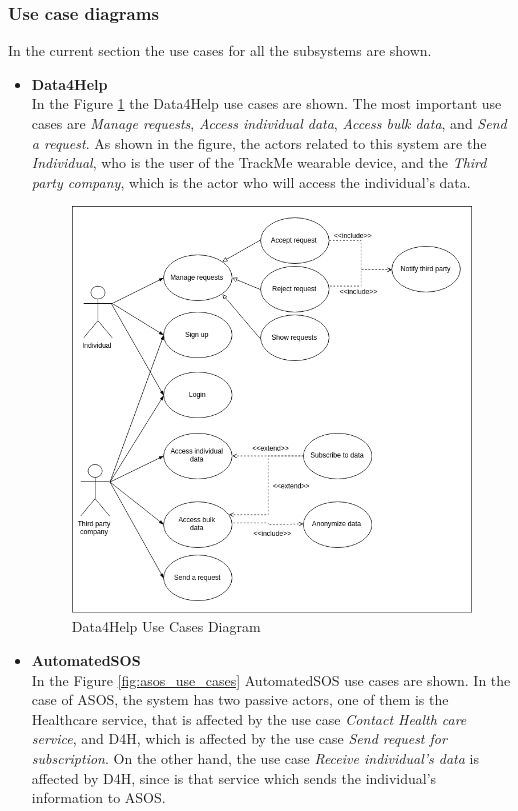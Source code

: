 \documentclass[12pt]{article}
\begin{document}
\subsubsection{Use case diagrams}
In the current section the use cases for all the subsystems are shown.

\begin{itemize}
\item{\textbf{Data4Help}} \\
In the Figure \ref{fig:d4h_use_cases} the Data4Help use cases are shown. The most important use cases are \textit{Manage requests}, \textit{Access individual data}, \textit{Access bulk data}, and \textit{Send a request}. As shown in the figure, the actors related to this system are the \textit{Individual}, who is the user of the TrackMe wearable device, and the \textit{Third party company}, which is the actor who will access the individual's data.

\begin{figure}[H]
\centering
	\includegraphics[scale=0.6]{Diagrams/d4h_use_cases.png}
\caption[Data4Help Use Cases Diagram]{Data4Help Use Cases Diagram}
\label{fig:d4h_use_cases}
\end{figure}

\item{\textbf{AutomatedSOS}}\\
In the Figure \ref{fig:asos_use_cases} AutomatedSOS use cases are shown. In the case of ASOS, the system has two passive actors, one of them is the Healthcare service, that is affected by the use case \textit{Contact Health care service}, and D4H, which is affected by the use case \textit{Send request for subscription}. On the other hand, the use case \textit{Receive individual's data} is affected by D4H, since is that service which sends the individual's information to ASOS.


\end{itemize}
\end{document}
